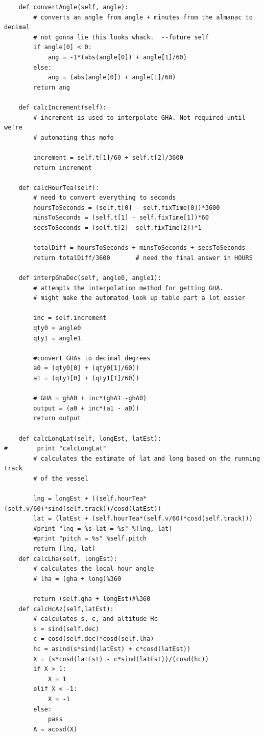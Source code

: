 \documentclass[12pt,a4paper]{book}
\begin{document}
\begin{appendices}
\begin{verbatim}
    def convertAngle(self, angle):
        # converts an angle from angle + minutes from the almanac to decimal
        # not gonna lie this looks whack.  --future self
        if angle[0] < 0:
            ang = -1*(abs(angle[0]) + angle[1]/60)
        else:
            ang = (abs(angle[0]) + angle[1]/60) 
        return ang

    def calcIncrement(self):
        # increment is used to interpolate GHA. Not required until we're
        # automating this mofo

        increment = self.t[1]/60 + self.t[2]/3600
        return increment
    
    def calcHourTea(self):
        # need to convert everything to seconds
        hoursToSeconds = (self.t[0] - self.fixTime[0])*3600 
        minsToSeconds = (self.t[1] - self.fixTime[1])*60    
        secsToSeconds = (self.t[2] -self.fixTime[2])*1      

        totalDiff = hoursToSeconds + minsToSeconds + secsToSeconds
        return totalDiff/3600       # need the final answer in HOURS

    def interpGhaDec(self, angle0, angle1):
        # attempts the interpolation method for getting GHA.
        # might make the automated look up table part a lot easier
        
        inc = self.increment
        qty0 = angle0
        qty1 = angle1
        
        #convert GHAs to decimal degrees
        a0 = (qty0[0] + (qty0[1]/60))
        a1 = (qty1[0] + (qty1[1]/60))

        # GHA = ghA0 + inc*(ghA1 -ghA0)  
        output = (a0 + inc*(a1 - a0))        
        return output

    def calcLongLat(self, longEst, latEst):
#        print "calcLongLat"
        # calculates the estimate of lat and long based on the running track
        # of the vessel

        lng = longEst + ((self.hourTea*(self.v/60)*sind(self.track))/cosd(latEst))
        lat = (latEst + (self.hourTea*(self.v/60)*cosd(self.track)))
        #print "lng = %s lat = %s" %(lng, lat)
        #print "pitch = %s" %self.pitch
        return [lng, lat]
    def calcLha(self, longEst):
        # calculates the local hour angle
        # lha = (gha + long)%360
        
        return (self.gha + longEst)#%360 
    def calcHcAz(self,latEst):
        # calculates s, c, and altitude Hc 
        s = sind(self.dec)
        c = cosd(self.dec)*cosd(self.lha)
        hc = asind(s*sind(latEst) + c*cosd(latEst))
        X = (s*cosd(latEst) - c*sind(latEst))/(cosd(hc))
        if X > 1:
            X = 1
        elif X < -1:
            X = -1
        else:
            pass
        A = acosd(X)
        

\end{verbatim}
\end{appendices}
\end{document}
